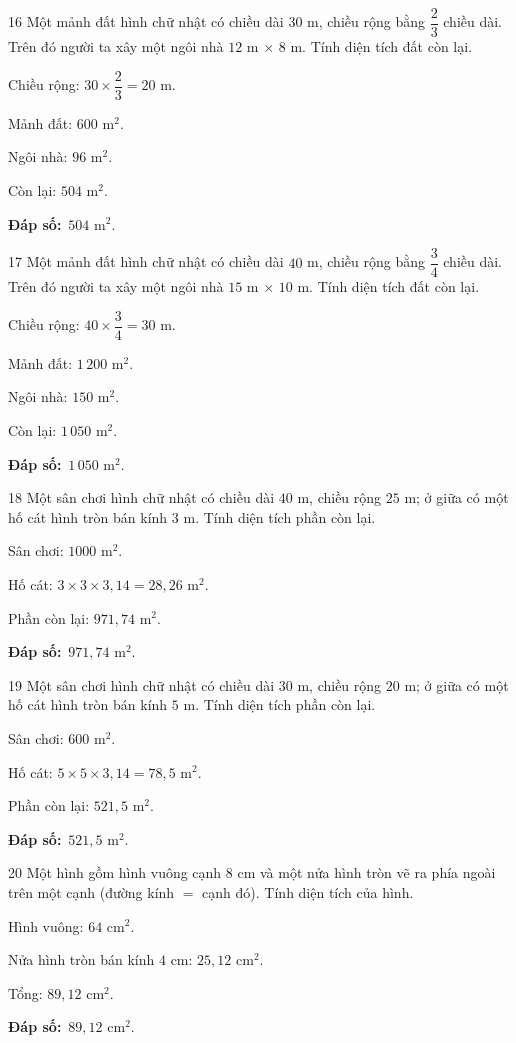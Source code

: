 \documentclass[11pt]{article}
\newif\ifsol \solfalse
\providecommand{\AnsWord}{Đáp số}
\newcommand{\dapso}[1]{\par\textbf{\AnsWord:}\ #1}
\newcommand{\probsol}[1]{%
  \begin{lrbox}{\solmeasure}\begin{minipage}{\dimexpr\linewidth-24pt\relax}#1\end{minipage}\end{lrbox}%
  \ifsol
    \begin{solbox}#1\end{solbox}%
  \else
    \setlength{\solht}{\dimexpr\ht\solmeasure+\dp\solmeasure+0.85cm\relax}%
    \ifdim\solht<1.35cm\setlength{\solht}{1.35cm}\fi
    \begin{tcolorbox}[colback=white,colframe=Line,boxrule=0.8pt,arc=5pt,
      left=8pt,right=8pt,top=4pt,bottom=4pt,height=\solht]{\footnotesize\color{Slate}\itshape\WorkWord}\end{tcolorbox}%
  \fi}
\newcommand{\gap}{\vspace{0.3cm}}
\def\WorkWord{Bài làm:}
\def\AnsWord{Đáp số}
\begin{document}
\gap
\begin{probbox}{16}{\relax}
Một mảnh đất hình chữ nhật có chiều dài $30$ m, chiều rộng bằng $\dfrac{2}{3}$ chiều dài. Trên đó người ta xây một ngôi nhà $12$ m $\times$ $8$ m. Tính diện tích đất còn lại.
\end{probbox}
\probsol{
Chiều rộng: $30\times\dfrac{2}{3}=20$ m.\par Mảnh đất: $600$ m$^2$.\par Ngôi nhà: $96$ m$^2$.\par Còn lại: $504$ m$^2$.
\dapso{$504$ m$^2$.}}
\gap
\begin{probbox}{17}{\relax}
Một mảnh đất hình chữ nhật có chiều dài $40$ m, chiều rộng bằng $\dfrac{3}{4}$ chiều dài. Trên đó người ta xây một ngôi nhà $15$ m $\times$ $10$ m. Tính diện tích đất còn lại.
\end{probbox}
\probsol{
Chiều rộng: $40\times\dfrac{3}{4}=30$ m.\par Mảnh đất: $1\,200$ m$^2$.\par Ngôi nhà: $150$ m$^2$.\par Còn lại: $1\,050$ m$^2$.
\dapso{$1\,050$ m$^2$.}}
\gap
\begin{probbox}{18}{\relax}
Một sân chơi hình chữ nhật có chiều dài $40$ m, chiều rộng $25$ m; ở giữa có một hố cát hình tròn bán kính $3$ m. Tính diện tích phần còn lại.
\end{probbox}
\probsol{
Sân chơi: $1000$ m$^2$.\par Hố cát: $3\times3\times3{,}14=28{,}26$ m$^2$.\par Phần còn lại: $971{,}74$ m$^2$.
\dapso{$971{,}74$ m$^2$.}}
\gap
\begin{probbox}{19}{\relax}
Một sân chơi hình chữ nhật có chiều dài $30$ m, chiều rộng $20$ m; ở giữa có một hố cát hình tròn bán kính $5$ m. Tính diện tích phần còn lại.
\end{probbox}
\probsol{
Sân chơi: $600$ m$^2$.\par Hố cát: $5\times5\times3{,}14=78{,}5$ m$^2$.\par Phần còn lại: $521{,}5$ m$^2$.
\dapso{$521{,}5$ m$^2$.}}
\gap
\begin{probbox}{20}{\relax}
Một hình gồm hình vuông cạnh $8$ cm và một nửa hình tròn vẽ ra phía ngoài trên một cạnh (đường kính $=$ cạnh đó). Tính diện tích của hình.
\end{probbox}
\probsol{
Hình vuông: $64$ cm$^2$.\par Nửa hình tròn bán kính $4$ cm: $25{,}12$ cm$^2$.\par Tổng: $89{,}12$ cm$^2$.
\dapso{$89{,}12$ cm$^2$.}}
\end{document}
